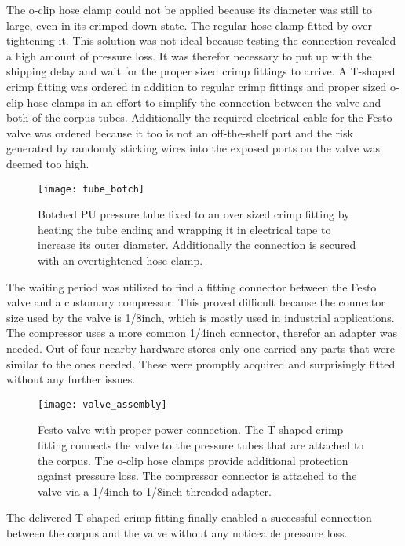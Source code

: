 The o-clip hose clamp could not be applied because its diameter was still to large, even in its crimped down state. The regular hose clamp fitted by over tightening it. This solution was not ideal because testing the connection revealed a high amount of pressure loss. It was therefor necessary to put up with the shipping delay and wait for the proper sized crimp fittings to arrive. A T-shaped crimp fitting was ordered in addition to regular crimp fittings and proper sized o-clip hose clamps in an effort to simplify the connection between the valve and both of the corpus tubes. Additionally the required electrical cable for the Festo valve was ordered because it too is not an off-the-shelf part and the risk generated by randomly sticking wires into the exposed ports on the valve was deemed too high.

\begin{figure}[h]
\centering

\texttt{[image: tube\_botch]}

\caption{Botched PU pressure tube fixed to an over sized crimp fitting by heating the tube ending and wrapping it in electrical tape to increase its outer diameter. Additionally the connection is secured with an overtightened hose clamp.}
\end{figure}

The waiting period was utilized to find a fitting connector between the Festo valve and a customary compressor. This proved difficult because the connector size used by the valve is 1/8inch, which is mostly used in industrial applications. The compressor uses a more common 1/4inch connector, therefor an adapter was needed. Out of four nearby hardware stores only one carried any parts that were similar to the ones needed. These were promptly acquired and surprisingly fitted without any further issues.

\begin{figure}[h]
\centering

\texttt{[image: valve\_assembly]}

\caption{Festo valve with proper power connection. The T-shaped crimp fitting connects the valve to the pressure tubes that are attached to the corpus. The o-clip hose clamps provide additional protection against pressure loss. The compressor connector is attached to the valve via a 1/4inch to 1/8inch threaded adapter.}
\end{figure}

The delivered T-shaped crimp fitting finally enabled a successful connection between the corpus and the valve without any noticeable pressure loss.  

